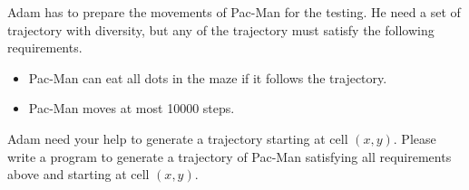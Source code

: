 Adam has to prepare the movements of Pac-Man for the testing. 
He need a set of trajectory with diversity, 
but any of the trajectory must satisfy the following requirements.
\begin{itemize}
\tightlist
\item Pac-Man can eat all dots in the maze if it follows the trajectory.
\item Pac-Man moves at most 10000 steps.
\end{itemize}
Adam need your help to generate a trajectory starting at cell $(x,y)$.
Please write a program to generate a trajectory of Pac-Man satisfying all 
requirements above and starting at cell $(x,y)$.

